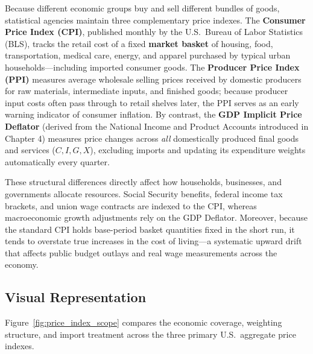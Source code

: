 \documentclass[11pt,letterpaper]{article}
\begin{document}
Because different economic groups buy and sell different bundles of goods, statistical agencies maintain three complementary price indexes. The \textbf{Consumer Price Index (CPI)}, published monthly by the U.S.\ Bureau of Labor Statistics (BLS), tracks the retail cost of a fixed \textbf{market basket} of housing, food, transportation, medical care, energy, and apparel purchased by typical urban households—including imported consumer goods. The \textbf{Producer Price Index (PPI)} measures average wholesale selling prices received by domestic producers for raw materials, intermediate inputs, and finished goods; because producer input costs often pass through to retail shelves later, the PPI serves as an early warning indicator of consumer inflation. By contrast, the \textbf{GDP Implicit Price Deflator} (derived from the National Income and Product Accounts introduced in Chapter 4) measures price changes across \emph{all} domestically produced final goods and services ($C, I, G, X$), excluding imports and updating its expenditure weights automatically every quarter.

These structural differences directly affect how households, businesses, and governments allocate resources. Social Security benefits, federal income tax brackets, and union wage contracts are indexed to the CPI, whereas macroeconomic growth adjustments rely on the GDP Deflator. Moreover, because the standard CPI holds base-period basket quantities fixed in the short run, it tends to overstate true increases in the cost of living—a systematic upward drift that affects public budget outlays and real wage measurements across the economy.

\subsection*{Visual Representation}
Figure~\ref{fig:price_index_scope} compares the economic coverage, weighting structure, and import treatment across the three primary U.S.\ aggregate price indexes.
\end{document}
